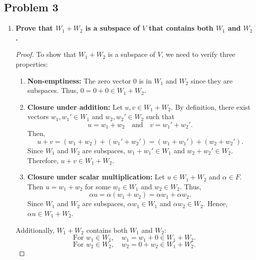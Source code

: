 \documentclass[12pt]{article}
\begin{document}
\newpage

\subsection*{Problem 3}

\begin{enumerate}[label=(\alph*)]
    \item \textbf{Prove that \( W_1 + W_2 \) is a subspace of \( V \) that contains both \( W_1 \) and \( W_2 \).}
    
    \begin{proof}
        To show that \( W_1 + W_2 \) is a subspace of \( V \), we need to verify three properties:
        
        \begin{enumerate}[label=\arabic*.]
            \item \textbf{Non-emptiness:}  
                The zero vector \( 0 \) is in \( W_1 \) and \( W_2 \) since they are subspaces. Thus, \( 0 = 0 + 0 \in W_1 + W_2 \).
            
            \item \textbf{Closure under addition:}  
                Let \( u, v \in W_1 + W_2 \). By definition, there exist vectors \( w_1, w_1' \in W_1 \) and \( w_2, w_2' \in W_2 \) such that
                \[
                u = w_1 + w_2 \quad \text{and} \quad v = w_1' + w_2'.
                \]
                Then,
                \[
                u + v = (w_1 + w_2) + (w_1' + w_2') = (w_1 + w_1') + (w_2 + w_2').
                \]
                Since \( W_1 \) and \( W_2 \) are subspaces, \( w_1 + w_1' \in W_1 \) and \( w_2 + w_2' \in W_2 \). Therefore, \( u + v \in W_1 + W_2 \).
            
            \item \textbf{Closure under scalar multiplication:}  
                Let \( u \in W_1 + W_2 \) and \( \alpha \in F \). Then \( u = w_1 + w_2 \) for some \( w_1 \in W_1 \) and \( w_2 \in W_2 \). Thus,
                \[
                \alpha u = \alpha(w_1 + w_2) = \alpha w_1 + \alpha w_2.
                \]
                Since \( W_1 \) and \( W_2 \) are subspaces, \( \alpha w_1 \in W_1 \) and \( \alpha w_2 \in W_2 \). Hence, \( \alpha u \in W_1 + W_2 \).
        \end{enumerate}
        
        Additionally, \( W_1 + W_2 \) contains both \( W_1 \) and \( W_2 \):
        \[
        \text{For } w_1 \in W_1, \quad w_1 = w_1 + 0 \in W_1 + W_2.
        \]
        \[
        \text{For } w_2 \in W_2, \quad w_2 = 0 + w_2 \in W_1 + W_2.
        \]
        

\end{proof}
\end{enumerate}
\end{document}
